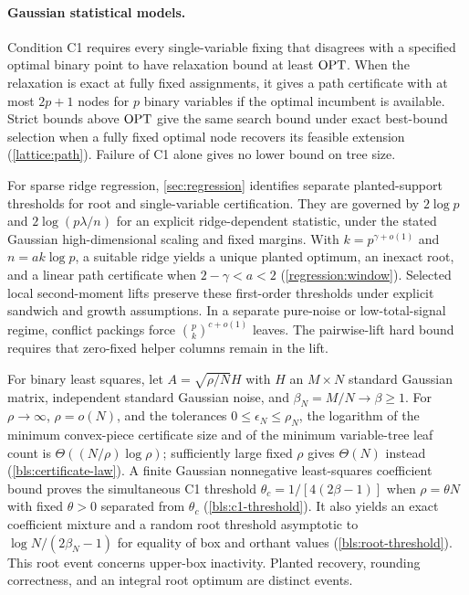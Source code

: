 \paragraph{Gaussian statistical models.}
Condition C1 requires every single-variable fixing that disagrees with a
specified optimal binary point to have relaxation bound at least $\operatorname{OPT}$.
When the relaxation is exact at fully fixed assignments, it gives a path
certificate with at most $2p+1$ nodes for $p$ binary variables if the optimal
incumbent is available. Strict bounds above $\operatorname{OPT}$ give the same search
bound under exact best-bound selection when a fully fixed optimal node
recovers its feasible extension (\cref{lattice:path}). Failure
of C1 alone gives no lower bound on tree size.

For sparse ridge regression, \cref{sec:regression} identifies separate
planted-support thresholds for root and single-variable certification.
They are governed by $2\log p$ and $2\log(p\lambda/n)$ for an explicit
ridge-dependent statistic, under the stated Gaussian high-dimensional
scaling and fixed margins. With $k=p^{\gamma+o(1)}$ and
$n=a k\log p$, a suitable ridge yields a unique planted optimum, an inexact
root, and a linear path certificate when $2-\gamma<a<2$ (\cref{regression:window}).
Selected local second-moment lifts preserve these first-order thresholds
under explicit sandwich and growth assumptions. In a separate pure-noise
or low-total-signal regime, conflict packings force
$\binom pk^{c+o(1)}$ leaves. The pairwise-lift hard bound requires that
zero-fixed helper columns remain in the lift.

For binary least squares, let $A=\sqrt{\rho/N}H$ with $H$ an $M\times N$
standard Gaussian matrix, independent standard Gaussian noise, and
$\beta_N=M/N\to\beta\geq1$. For $\rho\to\infty$, $\rho=o(N)$, and the
tolerances $0\leq\epsilon_N\leq\rho_N$, the logarithm of the minimum convex-piece
certificate size and of the minimum variable-tree leaf count is
$\Theta((N/\rho)\log\rho)$; sufficiently large fixed $\rho$ gives
$\Theta(N)$ instead (\cref{bls:certificate-law}). A finite Gaussian
nonnegative least-squares coefficient bound proves the simultaneous C1
threshold $\theta_c=1/[4(2\beta-1)]$ when $\rho=\theta N$ with fixed
$\theta>0$ separated from $\theta_c$ (\cref{bls:c1-threshold}). It also yields an exact
coefficient mixture and a random root threshold asymptotic to
$\log N/(2\beta_N-1)$ for equality of box and orthant values (\cref{bls:root-threshold}). This root
event concerns upper-box inactivity. Planted recovery, rounding correctness,
and an integral root optimum are distinct events.

